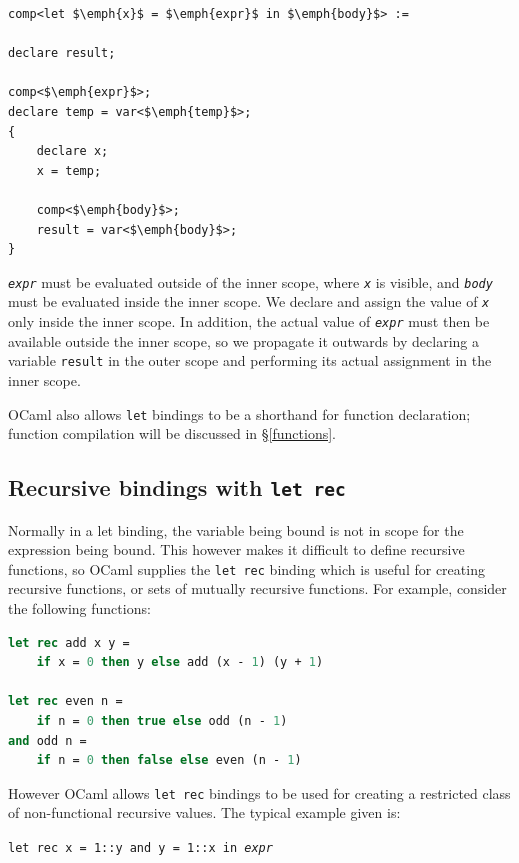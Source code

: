 \begin{lstlisting}
comp<let $\emph{x}$ = $\emph{expr}$ in $\emph{body}$> :=

declare result;

comp<$\emph{expr}$>;
declare temp = var<$\emph{temp}$>;
{
    declare x;
    x = temp;
    
    comp<$\emph{body}$>;
    result = var<$\emph{body}$>;
}
\end{lstlisting}

\texttt{\emph{expr}} must be evaluated outside of the inner scope, where
\texttt{\emph{x}} is visible, and \texttt{\emph{body}} must be evaluated inside
the inner scope. We declare and assign the value of \texttt{\emph{x}} only
inside the inner scope. In addition, the actual value of \texttt{\emph{expr}}
must then be available outside the inner scope, so we propagate it outwards by
declaring a variable \texttt{result} in the outer scope and performing its
actual assignment in the inner scope.

OCaml also allows \texttt{let} bindings to be a shorthand for function
declaration; function compilation will be discussed in \S\ref{functions}.

\subsection{Recursive bindings with \texttt{let rec}}

Normally in a let binding, the variable being bound is not in scope for the
expression being bound. This however makes it difficult to define recursive
functions, so OCaml supplies the \texttt{let rec} binding which is useful for
creating recursive functions, or sets of mutually recursive functions. For
example, consider the following functions:

\begin{lstlisting}[language=Caml]
let rec add x y =
    if x = 0 then y else add (x - 1) (y + 1)

let rec even n =
    if n = 0 then true else odd (n - 1)
and odd n =
    if n = 0 then false else even (n - 1)
\end{lstlisting}

However OCaml allows \texttt{let rec} bindings to be used for creating a
restricted class of non-functional recursive values. The typical example given
is:

\begin{center}
    \texttt{let rec x = 1::y and y = 1::x in \emph{expr}}
\end{center}

